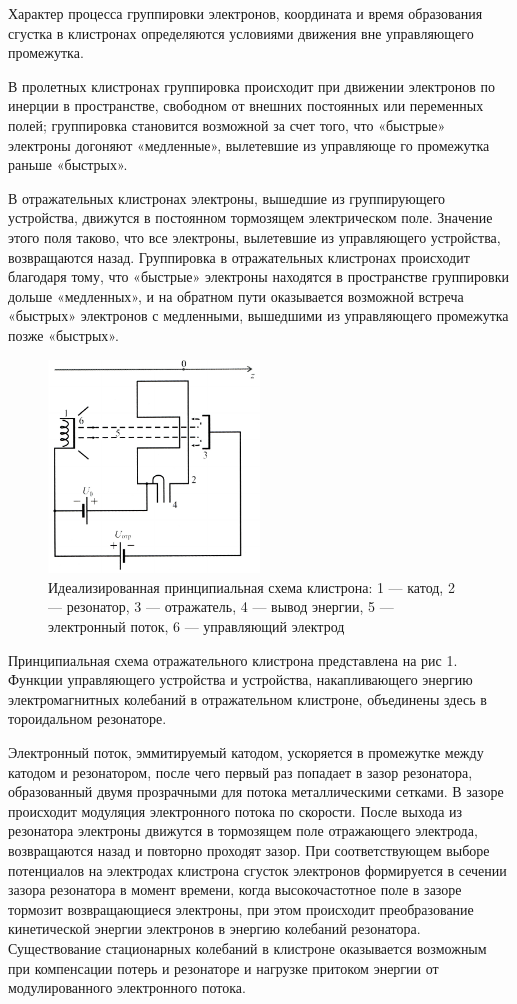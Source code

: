 Характер процесса группировки электронов, координата и время образо­вания сгустка в клистронах определяются условиями движения вне управ­ляющего промежутка.

В пролетных клистронах группировка происходит при движении элек­тронов по инерции в пространстве, свободном от внешних постоянных или
переменных полей; группировка становится возможной за счет того, что
«быстрые» электроны догоняют «медленные», вылетевшие из управляюще­
го промежутка раньше «быстрых».

В отражательных клистронах электроны, вышедшие из группирующего
устройства, движутся в постоянном тормозящем электрическом поле. Зна­чение этого поля таково, что все электроны, вылетевшие из управляющего
устройства, возвращаются назад. Группировка в отражательных клистро­нах происходит благодаря тому, что «быстрые» электроны находятся в про­странстве группировки дольше «медленных», и на обратном пути оказыва­ется возможной встреча «быстрых» электронов с медленными, вышедшими
из управляющего промежутка позже «быстрых».

\begin{figure}[h!]
	\centering
	\includegraphics[width=0.5\textwidth]{fig/fig1}
	\caption{Идеализированная принципиальная схема клистрона: 1 — катод, 2 — резонатор, 3 — отражатель, 4 — вывод энергии, 5 — электронный поток, 6 — управляющий электрод}
	\label{fig:potential_well}
\end{figure}

Принципиальная схема отражательного клистрона представлена на рис 1.
Функции управляющего устройства и устройства, накапливающего энер­гию электромагнитных колебаний в отражательном клистроне, объединены
здесь в тороидальном резонаторе.

Электронный поток, эммитируемый катодом, ускоряется в промежутке
между катодом и резонатором, после чего первый раз попадает в зазор
резонатора, образованный двумя прозрачными для потока металлическими сетками. В зазоре происходит модуляция электронного потока по скоро­сти. После выхода из резонатора электроны движутся в тормозящем поле
отражающего электрода, возвращаются назад и повторно проходят зазор.
При соответствующем выборе потенциалов на электродах клистрона сгусток
электронов формируется в сечении зазора резонатора в момент времени, когда
высокочастотное поле в зазоре тормозит возвращающиеся электроны,
при этом происходит преобразование кинетической энергии электронов в
энергию колебаний резонатора. Существование стационарных колебаний в
клистроне оказывается возможным при компенсации потерь и резонаторе и
нагрузке притоком энергии от модулированного электронного потока.


